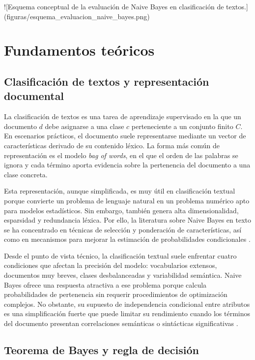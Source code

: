 ![Esquema conceptual de la evaluación de Naive Bayes en clasificación de textos.](figuras/esquema_evaluacion_naive_bayes.png)

\section{Fundamentos teóricos}

\subsection{Clasificación de textos y representación documental}

La clasificación de textos es una tarea de aprendizaje supervisado en la que un documento $d$ debe asignarse a una clase $c$ perteneciente a un conjunto finito $C$. En escenarios prácticos, el documento suele representarse mediante un vector de características derivado de su contenido léxico. La forma más común de representación es el modelo \textit{bag of words}, en el que el orden de las palabras se ignora y cada término aporta evidencia sobre la pertenencia del documento a una clase concreta.

Esta representación, aunque simplificada, es muy útil en clasificación textual porque convierte un problema de lenguaje natural en un problema numérico apto para modelos estadísticos. Sin embargo, también genera alta dimensionalidad, esparsidad y redundancia léxica. Por ello, la literatura sobre Naive Bayes en texto se ha concentrado en técnicas de selección y ponderación de características, así como en mecanismos para mejorar la estimación de probabilidades condicionales \cite{CHEN20095432,YOUN2009477,ZHANG2016137,Tang20162508}.

Desde el punto de vista técnico, la clasificación textual suele enfrentar cuatro condiciones que afectan la precisión del modelo: vocabularios extensos, documentos muy breves, clases desbalanceadas y variabilidad semántica. Naive Bayes ofrece una respuesta atractiva a ese problema porque calcula probabilidades de pertenencia sin requerir procedimientos de optimización complejos. No obstante, su supuesto de independencia condicional entre atributos es una simplificación fuerte que puede limitar su rendimiento cuando los términos del documento presentan correlaciones semánticas o sintácticas significativas \cite{Ganiz20111022,Gan2021}.

\subsection{Teorema de Bayes y regla de decisión}

